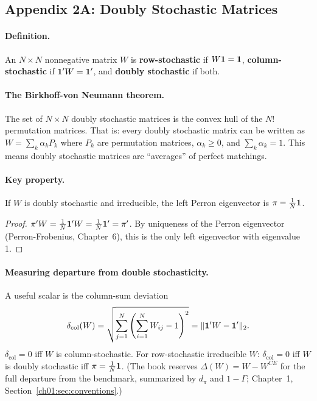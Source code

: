\documentclass[../structural_economics_book.tex]{subfiles}
\begin{document}
\subsection*{Appendix 2A: Doubly Stochastic Matrices}
\label{ch02:app:doubly_stochastic}

\paragraph{Definition.} An $N \times N$ nonnegative matrix $W$ is \textbf{row-stochastic} if $W\mathbf{1} = \mathbf{1}$, \textbf{column-stochastic} if $\mathbf{1}'W = \mathbf{1}'$, and \textbf{doubly stochastic} if both.

\paragraph{The Birkhoff-von Neumann theorem.} The set of $N \times N$ doubly stochastic matrices is the convex hull of the $N!$ permutation matrices. That is: every doubly stochastic matrix can be written as $W = \sum_{k} \alpha_k P_k$ where $P_k$ are permutation matrices, $\alpha_k \geq 0$, and $\sum_k \alpha_k = 1$. This means doubly stochastic matrices are ``averages'' of perfect matchings.

\paragraph{Key property.} If $W$ is doubly stochastic and irreducible, the left Perron eigenvector is $\pi = \frac{1}{N}\mathbf{1}$.

\begin{proof}
$\pi'W = \frac{1}{N}\mathbf{1}'W = \frac{1}{N}\mathbf{1}' = \pi'$. By uniqueness of the Perron eigenvector (Perron-Frobenius, Chapter~6), this is the only left eigenvector with eigenvalue 1.
\end{proof}

\paragraph{Measuring departure from double stochasticity.} A useful scalar is the column-sum deviation
\begin{equation}
\delta_{\text{col}}(W) = \sqrt{\sum_{j=1}^N \left(\sum_{i=1}^N W_{ij} - 1\right)^2} = \|\mathbf{1}'W - \mathbf{1}'\|_2.
\end{equation}
$\delta_{\text{col}} = 0$ iff $W$ is column-stochastic. For row-stochastic irreducible $W$: $\delta_{\text{col}} = 0$ iff $W$ is doubly stochastic iff $\pi = \frac{1}{N}\mathbf{1}$. (The book reserves $\Delta(W) = W - W^{CE}$ for the full departure from the benchmark, summarized by $d_\pi$ and $1 - \Gamma$; Chapter~1, Section~\ref{ch01:sec:conventions}.)
\end{document}
